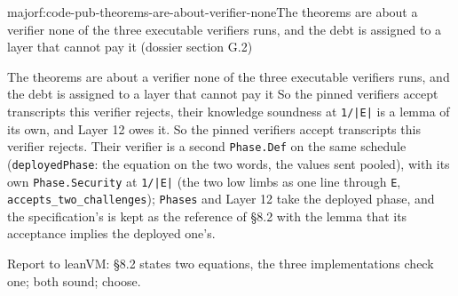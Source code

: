 \begin{finding}{major}{f:code-pub-theorems-are-about-verifier-none}{The theorems are about a verifier none of the three executable verifiers runs, and the debt is assigned to a layer that cannot pay it (dossier section G.2)}
\begin{change}{The theorems are about a verifier none of the three executable verifiers runs, and the debt is assigned to a layer that cannot pay it}
\asis So the pinned verifiers accept transcripts this verifier rejects, their knowledge soundness at \texttt{1/\allowbreak{}|E|} is a lemma of its own, and Layer 12 owes it.
\asproposed So the pinned verifiers accept transcripts this verifier rejects. Their verifier is a second \texttt{Phase.\allowbreak{}Def} on the same schedule (\texttt{deployedPhase}: the equation on the two words, the values sent pooled), with its own \texttt{Phase.\allowbreak{}Security} at \texttt{1/\allowbreak{}|E|} (the two low limbs as one line through \texttt{E}, \texttt{accepts\_\allowbreak{}two\_\allowbreak{}challenges}); \texttt{Phases} and Layer 12 take the deployed phase, and the specification's is kept as the reference of §8.2 with the lemma that its acceptance implies the deployed one's.
\end{change}
Report to leanVM: §8.2 states two equations, the three implementations check one; both sound; choose.


\end{finding}

